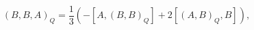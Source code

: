 \begin{equation}
(B,B,A)_{Q}=\frac{1}{3}\left(  -\left[  A,(B,B)_{Q}\right]  +2\left[
(A,B)_{Q},B\right]  \right)  ,\label{1.9}%
\end{equation}%
